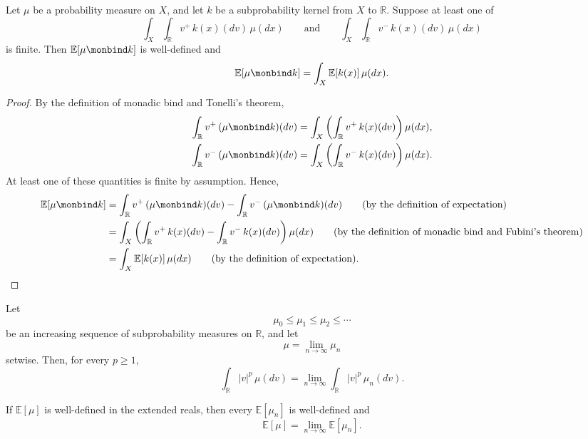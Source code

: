 \begin{lemma}
  \label{lem:extended-expectation-of-bind}
  Let $\mu$ be a probability measure on $X$, and let $k$ be a
  subprobability kernel from $X$ to $\mathbb R$. Suppose at least one
  of
  \[
    \int_X
      \int_{\mathbb R}v^+\,k(x)(dv)\,\mu(dx)
    \qquad\text{and}\qquad
    \int_X
      \int_{\mathbb R}v^-\,k(x)(dv)\,\mu(dx)
  \]
  is finite. Then $\mathbb E[\mu\monbind k]$ is well-defined and
  \[
    \mathbb E[\mu\monbind k]
    =
    \int_X
      \mathbb E[k(x)]\,\mu(dx).
  \]
\end{lemma}

\begin{proof}
  By the definition of monadic bind and Tonelli's theorem,
  \begin{align}
    \int_{\mathbb R}v^+\,(\mu\monbind k)(dv)
    &=
    \int_X
      \left(
        \int_{\mathbb R}v^+\,k(x)(dv)
      \right)
      \mu(dx),
    \\
    \int_{\mathbb R}v^-\,(\mu\monbind k)(dv)
    &=
    \int_X
      \left(
        \int_{\mathbb R}v^-\,k(x)(dv)
      \right)
      \mu(dx).
  \end{align}
  At least one of these quantities is finite by assumption. Hence,
  \begin{align}
    \mathbb E[\mu\monbind k]
    &=
    \int_{\mathbb R}v^+\,(\mu\monbind k)(dv)
    -
    \int_{\mathbb R}v^-\,(\mu\monbind k)(dv)
    \tag{\text{by the definition of expectation}}
    \\
    &=
    \int_X
      \left(
        \int_{\mathbb R}v^+\,k(x)(dv)
        -
        \int_{\mathbb R}v^-\,k(x)(dv)
      \right)
      \mu(dx)
    \tag{\text{by the definition of monadic bind and Fubini's theorem}}
    \\
    &=
    \int_X \mathbb E[k(x)]\,\mu(dx)
    \tag{\text{by the definition of expectation}}.
  \end{align}
\end{proof}

\begin{lemma}
  \label{lem:extended-expectation-increasing-limits}
  Let
  \[
    \mu_0\leq\mu_1\leq\mu_2\leq\cdots
  \]
  be an increasing sequence of subprobability measures on $\mathbb R$,
  and let
  \[
    \mu=\lim_{n\to\infty}\mu_n
  \]
  setwise. Then, for every $p\geq1$,
  \[
    \int_{\mathbb R}|v|^p\,\mu(dv)
    =
    \lim_{n\to\infty}
    \int_{\mathbb R}|v|^p\,\mu_n(dv).
  \]

  If $\mathbb E[\mu]$ is well-defined in the extended reals, then
  every $\mathbb E[\mu_n]$ is well-defined and
  \[
    \mathbb E[\mu]
    =
    \lim_{n\to\infty}\mathbb E[\mu_n].
  \]
\end{lemma}

